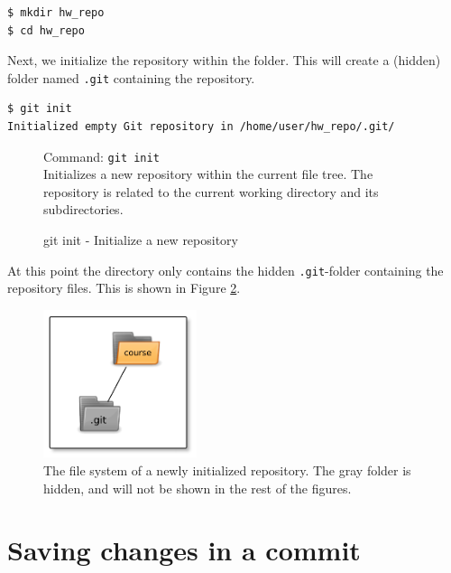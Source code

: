 \documentclass[../main/git_course_main.tex]{subfiles}
\begin{document}
\begin{codebox}
\begin{lstlisting}
$ mkdir hw_repo
$ cd hw_repo
\end{lstlisting}
\end{codebox}

Next, we initialize the repository within the folder. This will create a (hidden) folder named \verb$.git$ containing the repository.

\begin{codebox}
\begin{lstlisting}
$ git init
Initialized empty Git repository in /home/user/hw_repo/.git/
\end{lstlisting}
\end{codebox}

\begin{figure}[h!]
\begin{bluebox}
	Command: \verb$git init$ \\

	Initializes a new repository within the current file tree. The repository is related to the current working directory and its subdirectories.
\end{bluebox}
\label{command:init}
\caption{git init - Initialize a new repository}
\end{figure}

At this point the directory only contains the hidden \verb$.git$-folder containing the repository files. This is shown in Figure \ref{fig:dot_git}.

\begin{figure}[h]
	\centering
	\includegraphics[width=0.4\textwidth]{../visualizations/chapter2/c23_hidden_folder_in_git.pdf}
	\caption{The file system of a newly initialized repository. The gray folder is hidden, and will not be shown in the rest of the figures.}
	\label{fig:dot_git}
\end{figure}

\section{Saving changes in a commit}
\end{document}
